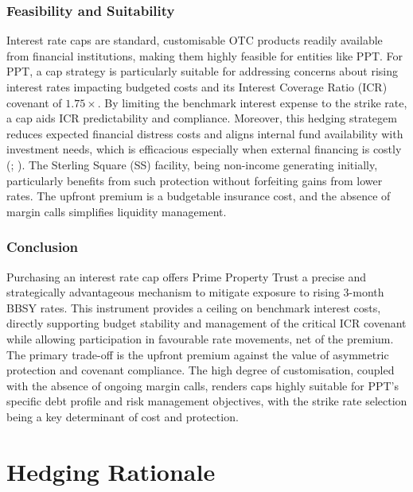 \documentclass[11pt, a4paper, british]{article}
\begin{document}
\subsubsection{Feasibility and Suitability}
Interest rate caps are standard, customisable OTC products readily available from financial institutions, making them highly feasible for entities like PPT. For PPT, a cap strategy is particularly suitable for addressing concerns about rising interest rates impacting budgeted costs and its Interest Coverage Ratio (ICR) covenant of $1.75 \times$. By limiting the benchmark interest expense to the strike rate, a cap aids ICR predictability and compliance. Moreover, this hedging strategem reduces expected financial distress costs and aligns internal fund availability with investment needs, which is efficacious especially when external financing is costly (\cite{gms}; \cite{abd}). The Sterling Square (SS) facility, being non-income generating initially, particularly benefits from such protection without forfeiting gains from lower rates. The upfront premium is a budgetable insurance cost, and the absence of margin calls simplifies liquidity management.

\subsubsection{Conclusion}
Purchasing an interest rate cap offers Prime Property Trust a precise and strategically advantageous mechanism to mitigate exposure to rising 3-month BBSY rates. This instrument provides a ceiling on benchmark interest costs, directly supporting budget stability and management of the critical ICR covenant while allowing participation in favourable rate movements, net of the premium. The primary trade-off is the upfront premium against the value of asymmetric protection and covenant compliance. The high degree of customisation, coupled with the absence of ongoing margin calls, renders caps highly suitable for PPT's specific debt profile and risk management objectives, with the strike rate selection being a key determinant of cost and protection.

\newpage

\section{Hedging Rationale}

\newpage

\printbibliography
\end{document}
